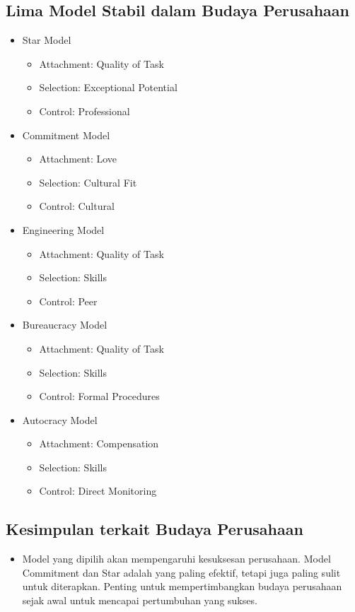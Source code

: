 \documentclass{article}
\begin{document}
\subsection{Lima Model Stabil dalam Budaya Perusahaan}
\begin{itemize}
    \item Star Model
          \begin{itemize}
              \item Attachment: Quality of Task
              \item Selection: Exceptional Potential
              \item Control: Professional
          \end{itemize}
    \item Commitment Model
          \begin{itemize}
              \item Attachment: Love
              \item Selection: Cultural Fit
              \item Control: Cultural
          \end{itemize}
    \item Engineering Model
          \begin{itemize}
              \item Attachment: Quality of Task
              \item Selection: Skills
              \item Control: Peer
          \end{itemize}
    \item Bureaucracy Model
          \begin{itemize}
              \item Attachment: Quality of Task
              \item Selection: Skills
              \item Control: Formal Procedures
          \end{itemize}
    \item Autocracy Model
          \begin{itemize}
              \item Attachment: Compensation
              \item Selection: Skills
              \item Control: Direct Monitoring
          \end{itemize}
\end{itemize}

\subsection{Kesimpulan terkait Budaya Perusahaan}
\begin{itemize}
    \item Model yang dipilih akan mempengaruhi kesuksesan perusahaan. Model Commitment dan Star adalah yang paling efektif, tetapi juga paling sulit untuk diterapkan. Penting untuk mempertimbangkan budaya perusahaan sejak awal untuk mencapai pertumbuhan yang sukses.
\end{itemize}
\end{document}
